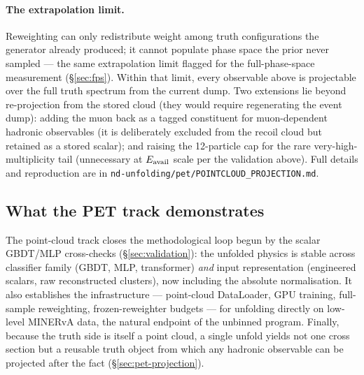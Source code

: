 \paragraph{The extrapolation limit.}
\label{sec:pet-projection-next}
Reweighting can only redistribute weight among truth configurations the
generator already produced; it cannot populate phase space the prior never
sampled --- the same extrapolation limit flagged for the full-phase-space
measurement (\S\ref{sec:fps}). Within that limit, every observable above is
projectable over the full truth spectrum from the current dump.
Two extensions lie beyond re-projection from the stored cloud (they would
require regenerating the event dump):
adding the muon back as a tagged constituent for muon-dependent hadronic
observables (it is deliberately excluded from the recoil cloud but retained as
a stored scalar); and raising the 12-particle cap for the rare
very-high-multiplicity tail (unnecessary at $E_{\mathrm{avail}}$ scale per the validation
above). Full details and reproduction are in
\texttt{nd-unfolding/pet/POINTCLOUD\_PROJECTION.md}.

\subsection{What the PET track demonstrates}
The point-cloud track closes the methodological loop begun by the scalar
GBDT/MLP cross-checks (\S\ref{sec:validation}): the unfolded physics is
stable across classifier family (GBDT, MLP, transformer) \emph{and} input
representation (engineered scalars, raw reconstructed clusters), now
including the absolute normalisation. It also establishes the
infrastructure --- point-cloud DataLoader, GPU training, full-sample
reweighting, frozen-reweighter budgets --- for unfolding directly on
low-level MINERvA data, the natural endpoint of the unbinned program.
Finally, because the truth side is itself a point cloud, a single unfold
yields not one cross section but a reusable truth object from which any
hadronic observable can be projected after the fact
(\S\ref{sec:pet-projection}).
